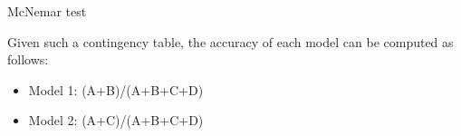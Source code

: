 \begin{vbframe}{McNemar test}
%
%
%
%
%
%
%

\framebreak

\begin{minipage}[c]{0.625\linewidth}
Given such a contingency table, the accuracy of each model can be computed as follows:
\begin{itemize}
  \item Model 1: (A+B)/(A+B+C+D)
  \item Model 2: (A+C)/(A+B+C+D)
\end{itemize}


\end{minipage}
\end{vbframe}
